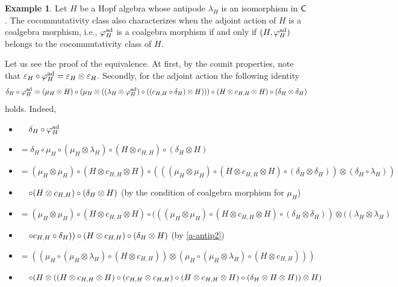\documentclass[11pt,reqno]{amsart}
\theoremstyle{plain}%
\theoremstyle{definition}
\newtheorem{example}[theorem]{Example}%
\theoremstyle{remark}
\begin{document}
\begin{example}\label{ccclass_adjoint}
	Let $H$ be a Hopf algebra whose antipode $\lambda_{H}$ is an isomorphism in ${\sf C}$. The cocommutativity class also characterizes when the adjoint action of $H$ is a coalgebra morphism, i.e., $\varphi_{H}^{{\rm ad}}$ is a coalgebra morphism if and only if $(H,\varphi_{H}^{{\rm ad}})$ belongs to the cocommutativity class of $H$. 
	
Let us see the proof of the equivalence. At first, by the counit properties, note 
that $\varepsilon_{H}\circ \varphi_{H}^{{\rm ad}}=\varepsilon_{H}\otimes \varepsilon_{H}.$ Secondly, for the adjoint action the following identity 
\begin{equation}\label{z1}
\delta_{H}\circ \varphi_{H}^{{\rm ad}}=(\mu_{H}\otimes H)\circ(\mu_{H}\otimes ((\lambda_{H}\otimes\varphi_{H}^{{\rm ad}})\circ((c_{H,H}\circ\delta_{H})\otimes H)))\circ(H\otimes c_{H,H}\otimes H)\circ(\delta_{H}\otimes\delta_{H})
\end{equation}
holds. Indeed,
\begin{itemize}
\itemindent=-32pt 
\item[]$\hspace{0.38cm}\delta_{H}\circ \varphi_{H}^{{\rm ad}}$
\item[]$=\delta_{H}\circ\mu_{H}\circ(\mu_{H}\otimes\lambda_{H})\circ(H\otimes c_{H,H})\circ(\delta_{H}\otimes H)$
\item[]$=(\mu_{H}\otimes\mu_{H})\circ(H\otimes c_{H,H}\otimes H)\circ(((\mu_{H}\otimes\mu_{H})\circ(H\otimes c_{H,H}\otimes H)\circ(\delta_{H}\otimes\delta_{H}))\otimes(\delta_{H}\circ\lambda_{H}))$
\item[]$\hspace{0.38cm}\circ(H\otimes c_{H,H})\circ(\delta_{H}\otimes H)$ {\footnotesize (by the condition of coalgebra morphism for $\mu_{H}$)}
\item[]$=(\mu_{H}\otimes\mu_{H})\circ(H\otimes c_{H,H}\otimes H)\circ(((\mu_{H}\otimes\mu_{H})\circ(H\otimes c_{H,H}\otimes H)\circ(\delta_{H}\otimes\delta_{H}))\otimes((\lambda_{H}\otimes\lambda_{H})$
\item[]$\hspace{0.38cm}\circ c_{H,H}\circ\delta_{H}))\circ(H\otimes c_{H,H})\circ(\delta_{H}\otimes H)$ {\footnotesize (by \eqref{a-antip2})}
\item[]$=((\mu_{H}\circ (\mu_{H}\otimes\lambda_{H})\circ(H\otimes c_{H,H}))\otimes(\mu_{H}\circ (\mu_{H}\otimes\lambda_{H})\circ(H\otimes c_{H,H})))$
\item[]$\hspace{0.38cm}\circ(H\otimes((H\otimes c_{H,H}\otimes H)\circ (c_{H,H}\otimes c_{H,H})\circ (H\otimes c_{H,H}\otimes H)\circ(\delta_{H}\otimes H\otimes H))\otimes H)$

\end{itemize}
\end{example}
\end{document}
